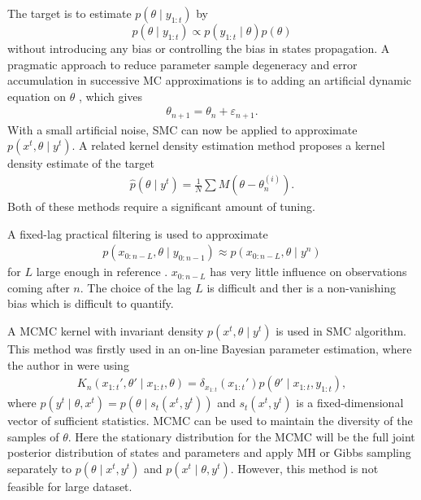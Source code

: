 The target is to estimate $p(\theta \mid y_{1:t})$ by
\begin{equation}
p(\theta \mid y_{1:t}) \propto p(y_{1:t} \mid \theta ) p(\theta )
\end{equation}
without introducing any bias or controlling the bias in states propagation. A pragmatic approach to reduce parameter sample degeneracy and error accumulation in successive MC approximations is to adding an artificial dynamic equation on $\theta$ \cite{higuchi2001self} \cite{kitagawa1998self}, which gives
\begin{align*}
\theta_{n+1} = \theta_n+\varepsilon_{n+1}.
\end{align*}
With a small artificial noise, SMC can now be applied to approximate $p(x^t,\theta\mid y^t)$. A related kernel density estimation method proposes a kernel density estimate of the target \cite{liu2001combined} \begin{align*}
\hat{p}(\theta\mid y^t) = \frac{1}{N}\sum M(\theta-\theta_n^{(i)}). 
\end{align*} 
Both of these methods require a significant amount of tuning.

A fixed-lag practical filtering is used to approximate
\begin{align*}
p(x_{0:n-L},\theta\mid y_{0:n-1})\approx p(x_{0:n-L},\theta \mid y^n)
\end{align*}
for $L$ large enough in reference \cite{polson2008practical}. $x_{0:n-L}$ has very little influence on observations coming after $n$. The choice of the lag $L$ is difficult and ther is a non-vanishing bias which is difficult to quantify.

A MCMC kernel with invariant density $p(x^t,\theta\mid y^t)$ is used in SMC algorithm. This method was firstly used in an on-line Bayesian parameter estimation, where the author in \cite{andrieu1999sequential} were using
\begin{align*}
K_n(x_{1:t}',\theta'\mid x_{1:t},\theta) = \delta_{x_{1:t}}(x_{1:t} ')p(\theta'\mid x_{1:t},y_{1:t}),
\end{align*}
where $p(y^t\mid\theta,x^t)=p(\theta\mid s_t(x^t,y^t))$ and $s_t(x^t,y^t)$ is a fixed-dimensional vector of sufficient statistics. MCMC can be used to maintain the diversity of the samples of $\theta$. Here the stationary distribution for the MCMC will be the full joint posterior distribution of states and parameters and apply MH or Gibbs sampling separately to $p(\theta \mid x^t,y^t)$ and $p(x^t \mid \theta,y^t)$. However, this method is not feasible for large dataset. 

